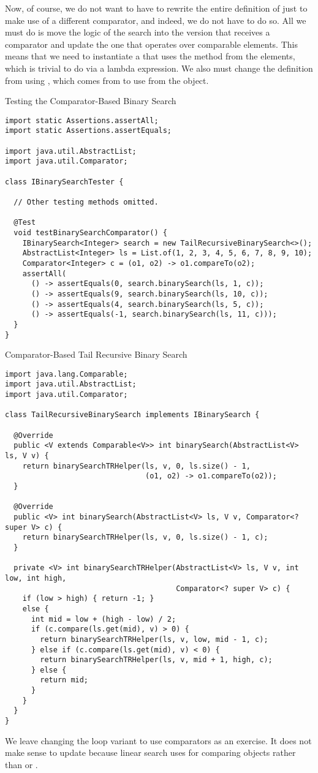 Now, of course, we do not want to have to rewrite the entire definition of  just to make use of a different comparator, and indeed, we do not have to do so. All we must do is move the logic of the search into the version that receives a comparator and update the one that operates over comparable elements. This means that we need to instantiate a  that uses the  method from the elements, which is trivial to do via a lambda expression. We also must change the definition from using , which comes from  to use  from the  object.

\begin{cl}[]{Testing the Comparator-Based Binary Search}
\begin{lstlisting}[language=MyJava]
import static Assertions.assertAll;
import static Assertions.assertEquals;

import java.util.AbstractList;
import java.util.Comparator;

class IBinarySearchTester {

  // Other testing methods omitted.

  @Test
  void testBinarySearchComparator() {
    IBinarySearch<Integer> search = new TailRecursiveBinarySearch<>();
    AbstractList<Integer> ls = List.of(1, 2, 3, 4, 5, 6, 7, 8, 9, 10);
    Comparator<Integer> c = (o1, o2) -> o1.compareTo(o2);
    assertAll(
      () -> assertEquals(0, search.binarySearch(ls, 1, c));
      () -> assertEquals(9, search.binarySearch(ls, 10, c));
      () -> assertEquals(4, search.binarySearch(ls, 5, c));
      () -> assertEquals(-1, search.binarySearch(ls, 11, c)));
  }
}
\end{lstlisting}
\end{cl}

\begin{cl}[]{Comparator-Based Tail Recursive Binary Search}
\begin{lstlisting}[language=MyJava]
import java.lang.Comparable;
import java.util.AbstractList;
import java.util.Comparator;

class TailRecursiveBinarySearch implements IBinarySearch {
  
  @Override
  public <V extends Comparable<V>> int binarySearch(AbstractList<V> ls, V v) {
    return binarySearchTRHelper(ls, v, 0, ls.size() - 1,
                                (o1, o2) -> o1.compareTo(o2));
  }
  
  @Override
  public <V> int binarySearch(AbstractList<V> ls, V v, Comparator<? super V> c) {
    return binarySearchTRHelper(ls, v, 0, ls.size() - 1, c);
  }
  
  private <V> int binarySearchTRHelper(AbstractList<V> ls, V v, int low, int high,
                                       Comparator<? super V> c) {
    if (low > high) { return -1; } 
    else {
      int mid = low + (high - low) / 2;
      if (c.compare(ls.get(mid), v) > 0) { 
        return binarySearchTRHelper(ls, v, low, mid - 1, c); 
      } else if (c.compare(ls.get(mid), v) < 0) { 
        return binarySearchTRHelper(ls, v, mid + 1, high, c); 
      } else { 
        return mid; 
      }
    }
  }
}
\end{lstlisting}
\end{cl}

We leave changing the loop variant to use comparators as an exercise. It does not make sense to update  because linear search uses  for comparing objects rather than  or .